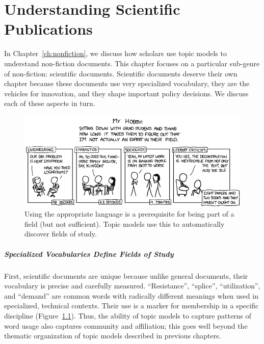 

\chapter{Understanding Scientific Publications}
\label{ch:sci}

In Chapter~\ref{ch:nonfiction}, we discuss how scholars use topic models to understand
non-fiction documents.  This chapter focuses on a particular sub-genre of
non-fiction: scientific documents.  Scientific documents deserve their own
chapter because these documents use very specialized
vocabulary, they are the vehicles for innovation, and they shape important
policy decisions.  We discuss each of these aspects in turn.

\begin{figure}
\includegraphics[width=\linewidth]{figures/sci_faking}
\caption{Using the appropriate language is a prerequisite for being
  part of a field (but not sufficient).  Topic models use this to
  automatically discover fields of study.}
\label{fig:faking}
\end{figure}

\paragraph{Specialized Vocabularies Define Fields of Study}

First, scientific documents are unique because unlike general documents,
their vocabulary is precise and carefully measured.  ``Resistance'', ``splice'',
``utilization'', and ``demand'' are common words with radically different
meanings when used in specialized, technical contexts.  Their use is a
marker for membership in a specific discipline
(Figure~\ref{fig:faking}).  Thus, the ability of topic models to capture
patterns of word usage also captures community and affiliation; this goes well
beyond the thematic organization of topic models described in previous chapters.

